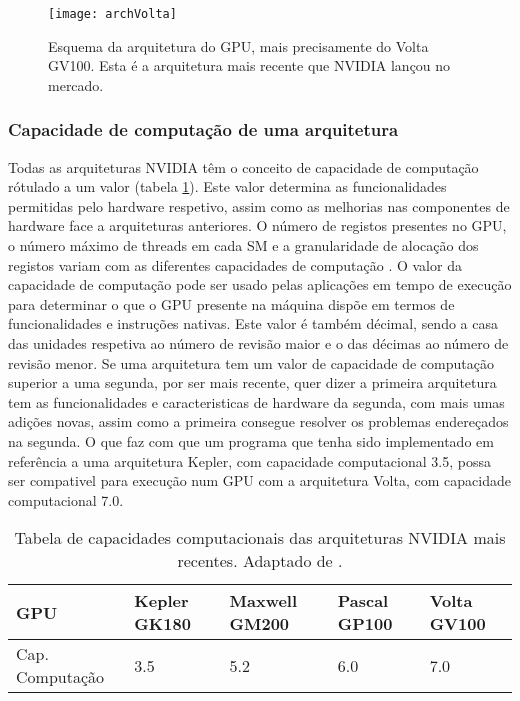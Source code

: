 \begin{itemize}
\end{itemize}
  \begin{figure}[ht]
  \centering
    {\texttt{[image: archVolta]}}
  \caption{Esquema da arquitetura do GPU, mais precisamente do Volta GV100\cite{voltaArch}. Esta é a arquitetura mais recente que NVIDIA lançou no mercado.}
  \label{voltaArch}
\end{figure}
\subsubsection{Capacidade de computação de uma arquitetura}
Todas as arquiteturas NVIDIA têm o conceito de capacidade de computação rótulado a um valor (tabela \ref{tabelaCap}). Este valor determina as funcionalidades permitidas pelo hardware respetivo, assim como as melhorias nas componentes de hardware face a arquiteturas anteriores. O número de registos presentes no GPU, o número máximo de threads em cada SM e a granularidade de alocação dos registos variam com as diferentes capacidades de computação \cite{cudaProgGuide}. O valor da capacidade de computação pode ser usado pelas aplicações em tempo de execução para determinar o que o GPU presente na máquina dispõe em termos de funcionalidades e instruções nativas. Este valor é também décimal, sendo a casa das unidades respetiva ao número de revisão maior e o das décimas ao número de revisão menor. Se uma arquitetura tem um valor de capacidade de computação superior a uma segunda, por ser mais recente, quer dizer a primeira arquitetura tem as funcionalidades e caracteristicas de hardware da segunda, com mais umas adições novas, assim como a primeira consegue resolver os problemas endereçados na segunda. O que faz com que um programa que tenha sido implementado em referência a uma arquitetura Kepler, com capacidade computacional 3.5, possa ser compativel para execução num GPU com a arquitetura Volta, com capacidade computacional 7.0.
\begin{table}[]
\centering

\begin{tabular}{|l|l|l|l|l|}
\hline
GPU             & Kepler GK180 & Maxwell GM200 & Pascal GP100 & Volta GV100 \\ \hline
Cap. Computação & 3.5          & 5.2           & 6.0          & 7.0         \\ \hline
\end{tabular}
\caption{Tabela de capacidades computacionais das arquiteturas NVIDIA mais recentes. Adaptado de \cite{voltaArch}.}
\label{tabelaCap}
\end{table}
%
%
